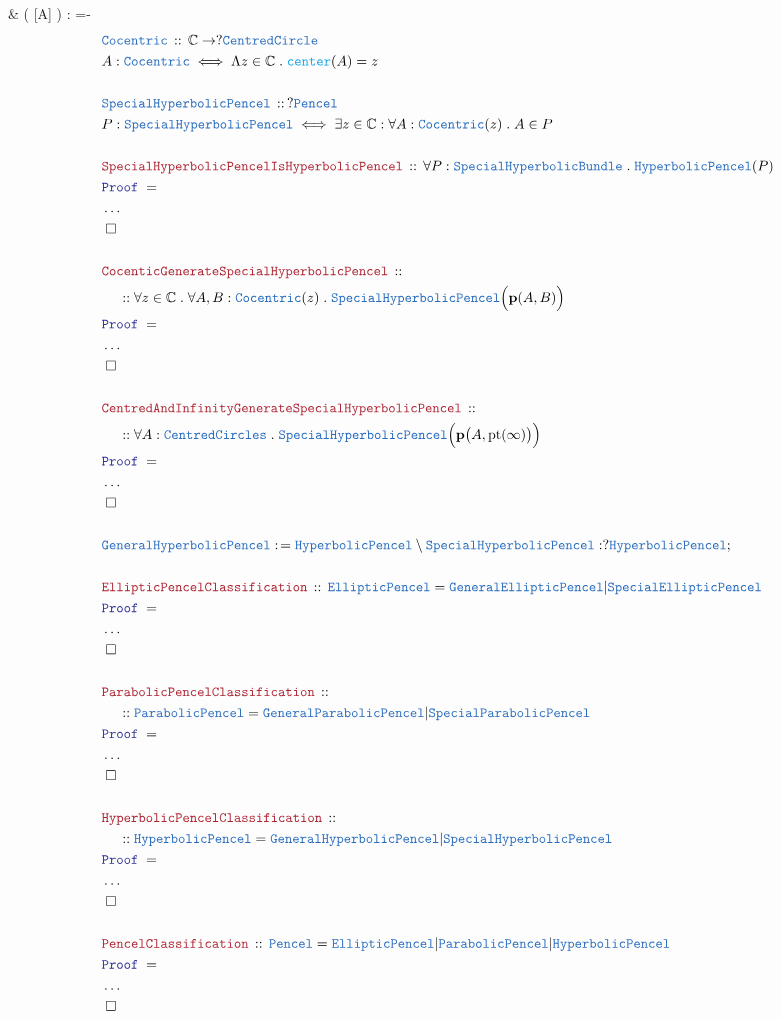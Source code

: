 \documentclass[12pt]{scrartcl}
\newcommand{\TYPE}[1]{\textcolor{NavyBlue}{\mathtt{#1}}}
\newcommand{\FUNC}[1]{\textcolor{Cerulean}{\mathtt{#1}}}
\newcommand{\LOGIC}[1]{\textcolor{Blue}{\mathtt{#1}}}
\newcommand{\THM}[1]{\textcolor{Maroon}{\mathtt{#1}}}
\renewcommand{\.}{\; . \;}
\newcommand{\de}{: \kern 0.1pc =}
\newcommand{\Act}[1]{\left( #1 \right)}
\newcommand{\Theorem}[2]{& \THM{#1} \, :: \, #2 \\ & \Proof = \\ }
\newcommand{\DeclareType}[2]{& \TYPE{#1} \, :: \, #2 \\}
\newcommand{\DefineType}[3]{& #1 : \TYPE{#2} \iff #3 \\}
\newcommand{\DefineFunc}[3]{&  \FUNC{#1}\Act{#2} \de #3 \\}
\newcommand{\NewLine}{\\ & \kern 1pc}
\newcommand{\Page}[1]{ \begin{align*} #1 \end{align*}   }
\newcommand{\NoProof}{ & \ldots \\ \EndProof}
\newcommand{\Complex}{\mathbb{C}}
\newcommand{\Conclude}[3]{& #1 \de #2 : #3; \\}
\newcommand{\QED}{\; \square}
\newcommand{\EndProof}{& \QED \\}
\newcommand{\Proof}{\LOGIC{Proof} \; }
\newcommand{\p}{\mathbf{p}}
\begin{document}
{	\DefineFunc{center}{[A]}{-}
}\Page{
	\DeclareType{Cocentric}{\Complex \to ?\TYPE{CentredCircle}}
	\DefineType{A}{Cocentric}{\Lambda z \in \Complex \. \FUNC{center}(A) = z}
	\\
	\DeclareType{SpecialHyperbolicPencel}{?\TYPE{Pencel}}
	\DefineType{P}{SpecialHyperbolicPencel}
	{
		\exists z \in \Complex : 
		\forall A : \TYPE{Cocentric}(z) \.
		A \in P
	}
	\\
	\Theorem{SpecialHyperbolicPencelIsHyperbolicPencel}
	{
		\forall P : \TYPE{SpecialHyperbolicBundle} \.
		\TYPE{HyperbolicPencel}(P)
	}
	\NoProof
	\\
	\Theorem{CocenticGenerateSpecialHyperbolicPencel}
	{
		\NewLine ::
		\forall z \in \Complex \.
		\forall A,B : \TYPE{Cocentric}(z) \.
		\TYPE{SpecialHyperbolicPencel}\Big(\p(A,B)\Big)
	}
	\NoProof
	\\
	\Theorem{CentredAndInfinityGenerateSpecialHyperbolicPencel}
	{
		\NewLine ::
		\forall A : \TYPE{CentredCircles} \.
		\TYPE{SpecialHyperbolicPencel}\Big( \p\big(A,\mathrm{pt}(\infty)\big) \Big)
	}
	\NoProof
	\\
	\Conclude{\TYPE{GeneralHyperbolicPencel}}
	{
		\TYPE{HyperbolicPencel} 
		\setminus
		\TYPE{SpecialHyperbolicPencel}
	}
	{
		?\TYPE{HyperbolicPencel}
	}
	\\
	\Theorem{EllipticPencelClassification}
	{
		\TYPE{EllipticPencel} = 
		\TYPE{GeneralEllipticPencel} | \TYPE{SpecialEllipticPencel}
	}
	\NoProof
	\\
	\Theorem{ParabolicPencelClassification}
	{
		\NewLine ::
		\TYPE{ParabolicPencel} = 
		\TYPE{GeneralParabolicPencel} | \TYPE{SpecialParabolicPencel}
	}
	\NoProof
	\\
	\Theorem{HyperbolicPencelClassification}
	{
		\NewLine ::
		\TYPE{HyperbolicPencel} = 
		\TYPE{GeneralHyperbolicPencel} | \TYPE{SpecialHyperbolicPencel}
	}
	\NoProof 
	\\
	\Theorem{PencelClassification}
	{
		\TYPE{Pencel} = 
		\TYPE{EllipticPencel} | 
		\TYPE{ParabolicPencel} |
		\TYPE{HyperbolicPencel}
	}
	\NoProof
}
\newpage
\end{document}
